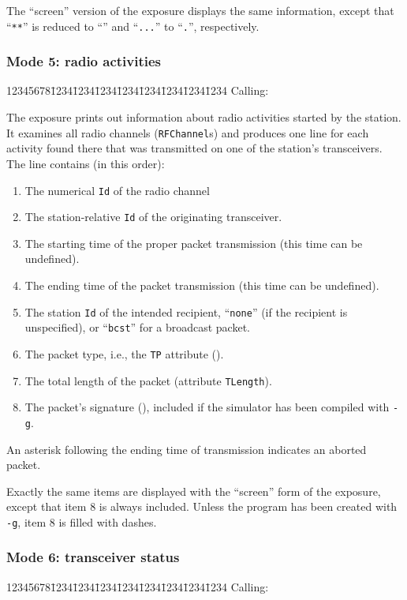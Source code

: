The ``screen'' version of the exposure displays the same information, except
that ``{\tt ***}'' is reduced to ``{\tt *}'' and ``{\tt ...}'' to ``{\tt .}'',
respectively.

\subsubsection*{Mode 5: radio activities}

{\tt\begin{tabbing}
12345678\=1234\=1234\=1234\=1234\=1234\=1234\=1234\=1234\kill
{\rm Calling:}
\end{tabbing}}

The exposure prints out information about radio activities started
by the station.
It examines all radio channels ({\tt RFChannel}s) and produces one line for
each activity found there that was transmitted on one of the station's
transceivers.
The line contains (in this order):

\begin{enumerate}
\item
The numerical {\tt Id} of the radio channel
\item
The station-relative {\tt Id} of the originating transceiver.
\item
The starting time of the proper packet transmission (this time can be
undefined).
\item
The ending time of the packet transmission (this time can be undefined).
\item
The station {\tt Id} of the intended recipient, ``{\tt none}'' (if the recipient
is unspecified), or ``{\tt bcst}'' for a broadcast packet.
\item
The packet type, i.e., the {\tt TP} attribute ().
\item
The total length of the packet (attribute {\tt TLength}).
\item
The packet's signature (), included if the simulator
has been compiled with {\tt -g}.
\end{enumerate}

An asterisk following the ending time of transmission indicates an aborted
packet.

Exactly the same items are displayed with the ``screen''
form of the exposure, except that item 8 is always included.
Unless the program has been created with {\tt -g}, item 8 is filled
with dashes.

\subsubsection*{Mode 6: transceiver status}
{\tt\begin{tabbing}
12345678\=1234\=1234\=1234\=1234\=1234\=1234\=1234\=1234\kill
{\rm Calling:}
\end{tabbing}}


